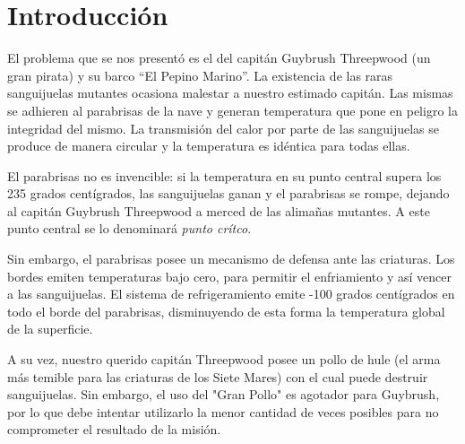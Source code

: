 
\lstset{escapechar=@,style=customc}




\fecha{\today}




\maketitle

\tableofcontents
\newpage

\section*{Introducción}

El problema que se nos presentó es el del capitán Guybrush Threepwood (un gran pirata) y su barco ``El Pepino Marino''. La existencia de las raras sanguijuelas mutantes ocasiona malestar a nuestro estimado capitán. Las mismas se adhieren al parabrisas de la nave y generan temperatura que pone en peligro la integridad del mismo. La transmisión del calor por parte de las sanguijuelas se produce de manera circular y la temperatura es idéntica para todas ellas. 
\par 
El parabrisas no es invencible: si la temperatura en su punto central supera los 235 grados centígrados, las sanguijuelas ganan y el parabrisas se rompe, dejando al capitán Guybrush Threepwood a merced de las alimañas mutantes. A este punto central se lo denominará \textit{punto crítco}.
\par 
Sin embargo, el parabrisas posee un mecanismo de defensa ante las criaturas. Los bordes emiten temperaturas bajo cero, para permitir el enfriamiento y así vencer a las sanguijuelas. El sistema de refrigeramiento emite -100 grados centígrados en todo el borde del parabrisas, disminuyendo de esta forma la temperatura global de la superficie. 
\par 
A su vez, nuestro querido capitán Threepwood posee un pollo de hule (el arma más temible para las criaturas de los Siete Mares) con el cual puede destruir sanguijuelas. Sin embargo, el uso del "Gran Pollo" es agotador para Guybrush, por lo que debe intentar utilizarlo la menor cantidad de veces posibles para no comprometer el resultado de la misión. 

